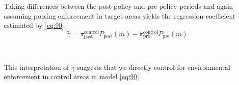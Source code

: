 \documentclass[12pt]{article}
\begin{document}
\quad Taking differences between the post-policy and pre-policy periods and again assuming pooling enforcement in target areas yields the regression coefficient estimated by \eqref{eq:90}:
\begin{equation*}
\widetilde{\gamma} = \pi_{\text{post}}^{\text{control}}P_{\text{post}}(m)-\pi_{\text{pre}}^{\text{control}}P_{\text{pre}}(m)
\end{equation*}

\

\quad This interpretation of $\widetilde{\gamma}$ suggests that we directly control for environmental enforcement in control areas in model \eqref{eq:90}. 
\ 
\end{document}
